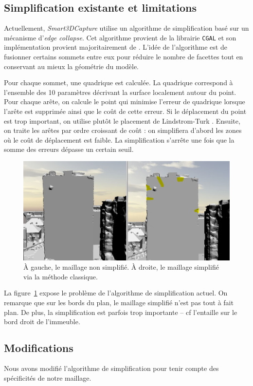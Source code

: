 \documentclass[12pt, twoside]{article}
\begin{document}
\subsection{Simplification existante et limitations}
Actuellement, \textit{Smart3DCapture} utilise un algorithme de simplification basé sur un mécanisme d'\textit{edge collapse}. Cet algorithme provient de la librairie \texttt{CGAL} et son implémentation provient majoritairement de \cite{simp1, simp2}. L'idée de l'algorithme est de fusionner certains sommets entre eux pour réduire le nombre de facettes tout en conservant au mieux la géométrie du modèle.

Pour chaque sommet, une quadrique est calculée. La quadrique correspond à l'ensemble des 10 paramètres décrivant la surface localement autour du point. Pour chaque arête, on calcule le point qui minimise l'erreur de quadrique lorsque l'arête est supprimée ainsi que le coût de cette erreur. Si le déplacement du point est trop important, on utilise plutôt le placement de Lindstrom-Turk \cite{simp2}. Ensuite, on traite les arêtes par ordre croissant de coût : on simplifiera d'abord les zones où le coût de déplacement est faible. La simplification s'arrête une fois que la somme des erreurs dépasse un certain seuil.

\begin{figure}[h]
\centering
\includegraphics[scale=0.33]{Simpli1.png}
\caption{\label{fig:simpl1} À gauche, le maillage non simplifié. À droite, le maillage simplifié via la méthode classique.}
\end{figure}

La figure~\ref{fig:simpl1} expose le problème de l'algorithme de simplification actuel. On remarque que sur les bords du plan, le maillage simplifié n'est pas tout à fait plan. De plus, la simplification est parfois trop importante -- cf l'entaille sur le bord droit de l'immeuble.

\subsection{Modifications}
Nous avons modifié l'algorithme de simplification pour tenir compte des spécificités de notre maillage.
\end{document}
